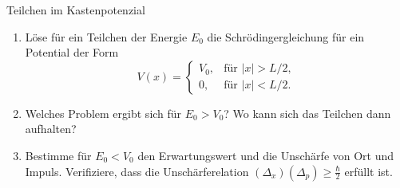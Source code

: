 \documentclass{pizzablatt}
\begin{document}

\begin{aufgabe}{Teilchen im Kastenpotenzial}
\begin{enumerate}
\item
Löse für ein Teilchen der Energie $E_0$ die Schrödingergleichung für
ein Potential der Form
\[ V(x) = \begin{cases}
  V_0, & \text{für $|x| > L/2$}, \\
  0,   & \text{für $|x| < L/2$}.
\end{cases} \]
\item
Welches Problem ergibt sich für $E_0 > V_0$? Wo kann sich das
Teilchen dann aufhalten?
\item
Bestimme für $E_0 < V_0$ den Erwartungswert und die Unschärfe von
Ort und Impuls. Verifiziere, dass die Unschärferelation
$(\Delta_x)(\Delta_p) \geq \frac{\hbar}{2}$ erfüllt ist.
\end{enumerate}
\end{aufgabe}
\end{document}
